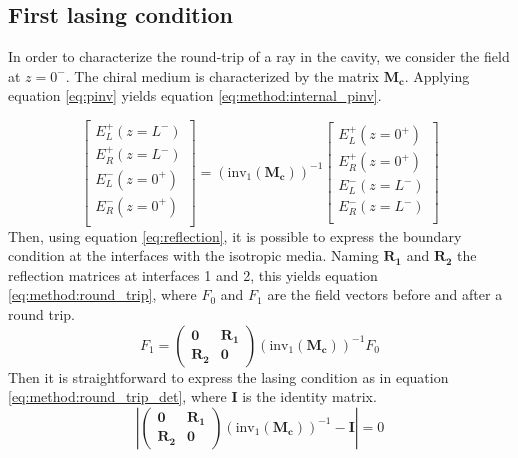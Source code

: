 \subsection{First lasing condition}
In order to characterize the round-trip of a ray in the cavity, we consider the field at $z=0^-$. The chiral medium is characterized by the matrix $\bm{M_c}$. Applying equation \ref{eq:pinv} yields equation \ref{eq:method:internal_pinv}.

\begin{equation}
\begin{bmatrix}
E_{L}^+(z=L^-) \\
E_{R}^+(z=L^-) \\
E_{L}^-(z=0^+) \\
E_{R}^-(z=0^+) \\
\end{bmatrix} = \left(\text{inv}_1(\bm{M_c})\right)^{-1}\begin{bmatrix}
E_{L}^+(z=0^+) \\
E_{R}^+(z=0^+) \\
E_{L}^-(z=L^-) \\
E_{R}^-(z=L^-) \\
\end{bmatrix}\label{eq:method:internal_pinv}
\end{equation}
Then, using equation \ref{eq:reflection}, it is possible to express the boundary condition at the interfaces with the isotropic media. Naming $\bm{R_1}$ and $\bm{R_2}$ the reflection matrices at interfaces 1 and 2, this yields equation \ref{eq:method:round_trip}, where $F_0$ and $F_1$ are the field vectors before and after a round trip.
\begin{equation}
F_1 = \begin{pmatrix}
\bm{0} & \bm{R_1}\\
\bm{R_2} & \bm{0}
\end{pmatrix}\left(\text{inv}_1(\bm{M_c})\right)^{-1}F_0 \label{eq:method:round_trip}
\end{equation}
Then it is straightforward to express the lasing condition as in equation \ref{eq:method:round_trip_det}, where $\bm{I}$ is the identity matrix.
\begin{equation}
\left|\begin{pmatrix}
\bm{0} & \bm{R_1}\\
\bm{R_2} & \bm{0}
\end{pmatrix}\left(\text{inv}_1(\bm{M_c})\right)^{-1} - \bm{I}\right| = 0 \label{eq:method:round_trip_det}
\end{equation}

